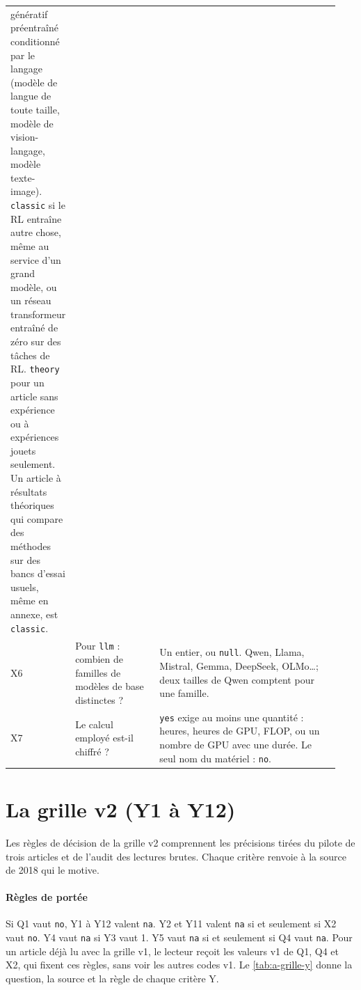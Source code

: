 \begin{small}
\begin{longtable}{@{}p{0.07\linewidth}>{\raggedright\arraybackslash}p{0.27\linewidth}>{\raggedright\arraybackslash}p{0.6\linewidth}@{}}
  génératif préentraîné conditionné par le langage (modèle de langue de toute taille, modèle de
  vision-langage, modèle texte-image). \texttt{classic} si le RL entraîne autre chose, même au service
  d'un grand modèle, ou un réseau transformeur entraîné de zéro sur des tâches de RL.
  \texttt{theory} pour un article sans expérience ou à expériences jouets seulement. Un article à
  résultats théoriques qui compare des méthodes sur des bancs d'essai usuels, même en annexe, est
  \texttt{classic}. \\
X6 & Pour \texttt{llm} : combien de familles de modèles de base distinctes ? & Un entier, ou
  \texttt{null}. Qwen, Llama, Mistral, Gemma, DeepSeek, OLMo\dots ; deux tailles de Qwen comptent pour
  une famille. \\
X7 & Le calcul employé est-il chiffré ? & \texttt{yes} exige au moins une quantité : heures,
  heures de GPU, FLOP, ou un nombre de GPU avec une durée. Le seul nom du matériel : \texttt{no}. \\
\end{longtable}
\end{small}

\section{La grille v2 (Y1 à Y12)}
\label{sec:a-y}

Les règles de décision de la grille v2 comprennent les précisions tirées du pilote de trois articles
et de l'audit des lectures brutes. Chaque critère renvoie à la source
de 2018 qui le motive.

\paragraph{Règles de portée} Si Q1 vaut \texttt{no}, Y1 à Y12 valent \texttt{na}. Y2 et Y11 valent
\texttt{na} si et seulement si X2 vaut \texttt{no}. Y4 vaut \texttt{na} si Y3 vaut 1. Y5 vaut
\texttt{na} si et seulement si Q4 vaut \texttt{na}. Pour un article déjà lu avec la grille v1, le
lecteur reçoit les valeurs v1 de Q1, Q4 et X2, qui fixent ces règles, sans voir les autres codes v1.
Le \cref{tab:a-grille-y} donne la question, la source et la règle de chaque critère Y.

